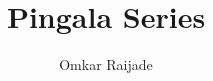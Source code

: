 \documentclass[journal,12pt,twocolumn]{IEEEtran}
\begin{document}
\let\StandardTheFigure\thefigure
\renewcommand{\thefigure}{\theproblem}



\def\putbox#1#2#3{\makebox[0in][l]{\makebox[#1][l]{}\raisebox{\baselineskip}[0in][0in]{\raisebox{#2}[0in][0in]{#3}}}}
     \def\rightbox#1{\makebox[0in][r]{#1}}
     \def\centbox#1{\makebox[0in]{#1}}
     \def\topbox#1{\raisebox{-\baselineskip}[0in][0in]{#1}}
     \def\midbox#1{\raisebox{-0.5\baselineskip}[0in][0in]{#1}}

\vspace{3cm}

\title{ 
Pingala Series
}


%
%
%

\author{ Omkar Raijade %
}
% 
%
\end{document}
